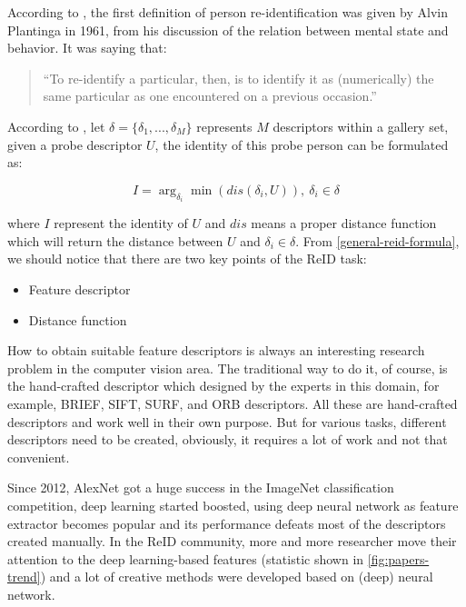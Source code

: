 According to \cite{survey-reid-past-present-feature-2016}, the first definition
of person re-identification was given by Alvin Plantinga in 1961, from his
discussion of the relation between mental state and behavior. It was saying
that:

\begin{quotation}
``To re-identify a particular, then, is to identify it as (numerically) the
same particular as one encountered on a previous occasion.''
\end{quotation}


According to \cite{survey-on-dl-for-reid-2019}, let $\delta=\{\delta_1, ...,
\delta_M \}$ represents $M$ descriptors within a gallery set, given a probe
descriptor $U$, the identity of this probe person can be formulated as:

\begin{equation}
\label{general-reid-formula}
I = \arg_{\delta_i} \min (dis(\delta_i, U)),  \: \delta_i \in \delta
\end{equation}

where $I$ represent the identity of $U$ and $dis$ means a proper distance
function which will return the distance between $U$ and $\delta_i \in \delta$.
From \autoref{general-reid-formula}, we should notice that there are two key
points of the ReID task:

\begin{itemize}
    \item Feature descriptor
    \item Distance function
\end{itemize}

How to obtain suitable feature descriptors is always an interesting research
problem in the computer vision area. The traditional way to do it, of course, is
the hand-crafted descriptor which designed by the experts in this domain, for
example, BRIEF, SIFT, SURF, and ORB descriptors. All these are hand-crafted
descriptors and work well in their own purpose. But for various tasks, different
descriptors need to be created, obviously, it requires a lot of work and not
that convenient.

Since 2012, AlexNet \cite{imagenet-classifi-cnn} got a huge success in the
ImageNet classification competition, deep learning started boosted, using deep
neural network as feature extractor becomes popular and its performance defeats
most of the descriptors created manually. In the ReID community, more and more
researcher move their attention to the deep learning-based features (statistic
shown in \autoref{fig:papers-trend}) and a lot of creative methods were
developed based on (deep) neural network.

